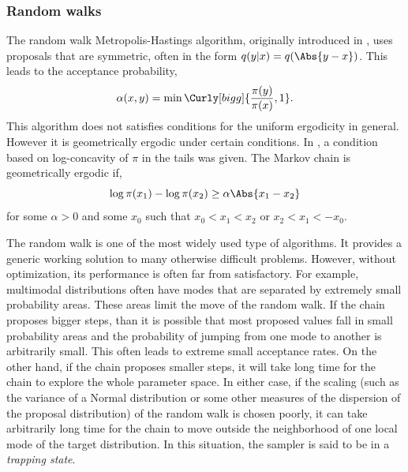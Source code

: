 \subsubsection{Random walks}
\label{ssub:Random walks}

The random walk Metropolis-Hastings algorithm, originally introduced in
\cite{Metropolis:1953ex}, uses proposals that are symmetric, often in the form
$q(y|x) = q(\Abs{y - x})$. This leads to the acceptance probability,
\begin{equation}
  \alpha(x,y) = \min\Curly[bigg]{\frac{\pi(y)}{\pi(x)},1}.
\end{equation}
This algorithm does not satisfies conditions for the uniform ergodicity in
general. However it is geometrically ergodic under certain conditions. In
\cite{Mengersen:1996th}, a condition based on log-concavity of $\pi$ in the
tails was given. The Markov chain is geometrically ergodic if,
\begin{equation}
  \log\pi(x_1) - \log\pi(x_2) \ge \alpha\Abs{x_1 - x_2}
\end{equation}
for some $\alpha > 0$ and some $x_0$ such that $x_0 < x_1 < x_2$ or $x_2 < x_1
< -x_0$.

The random walk is one of the most widely used type of \mcmc algorithms. It
provides a generic working solution to many otherwise difficult problems.
However, without optimization, its performance is often far from satisfactory.
For example, multimodal distributions often have modes that are separated by
extremely small probability areas. These areas limit the move of the random
walk. If the chain proposes bigger steps, than it is possible that most
proposed values fall in small probability areas and the probability of jumping
from one mode to another is arbitrarily small. This often leads to extreme
small acceptance rates. On the other hand, if the chain proposes smaller
steps, it will take long time for the chain to explore the whole parameter
space. In either case, if the scaling (such as the variance of a Normal
distribution or some other measures of the dispersion of the proposal
distribution) of the random walk is chosen poorly, it can take arbitrarily
long time for the chain to move outside the neighborhood of one local mode of
the target distribution. In this situation, the sampler is said to be in a
\emph{trapping state}.

